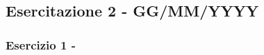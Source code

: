 \documentclass[../main.tex]{subfiles}
\begin{document}
\clearpage
\thispagestyle{empty}
\vspace*{7cm}
\subsection{Esercitazione 2 - GG/MM/YYYY}
\vspace*{1.5cm}




\subsubsection{Esercizio 1 - }
\end{document}
